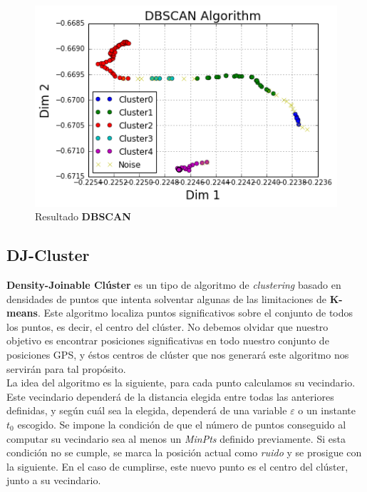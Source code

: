 \documentclass[a4paper, 12pt, spanish]{article}
\begin{document}
\begin{figure}[H]
	\begin{center}
	\includegraphics[scale=.7]{dbscan_2_0.png}
	\end{center}
	\caption{Resultado \textbf{DBSCAN}}
\end{figure}


\subsection{DJ-Cluster}

\textbf{Density-Joinable Cl\'uster}\cite{importantPlaces} es un tipo de algoritmo de \textit{clustering} basado en densidades de puntos que intenta solventar algunas de las limitaciones de \textbf{K-means}. Este algoritmo localiza puntos significativos sobre el conjunto de todos los puntos, es decir, el centro del cl\'uster. No debemos olvidar que nuestro objetivo es encontrar posiciones significativas en todo nuestro conjunto de posiciones GPS, y \'estos centros de cl\'uster que nos generar\'a este algoritmo nos servir\'an para tal prop\'osito. \\

La idea del algoritmo es la siguiente, para cada punto calculamos su vecindario. Este vecindario depender\'a de la distancia elegida entre todas las anteriores definidas, y seg\'un cu\'al sea la elegida, depender\'a de una variable $\varepsilon$ o un instante $t_0$ escogido. Se impone la condici\'on de que el n\'umero de puntos conseguido al computar su vecindario sea al menos un \textit{MinPts} definido previamente. Si esta condici\'on no se cumple, se marca la posici\'on actual como \textit{ruido} y se prosigue con la siguiente. En el caso de cumplirse, este nuevo punto es el centro del cl\'uster, junto a su vecindario.  \\
\end{document}
